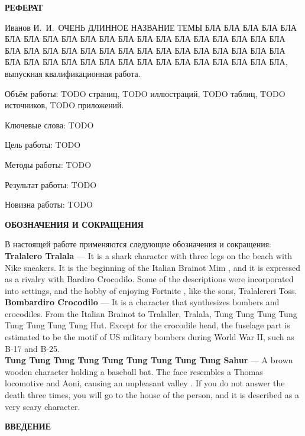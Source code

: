 \newpage
{\centering
\normal
\textbf{РЕФЕРАТ}\par
}

Иванов И.\ И.\ ОЧЕНЬ ДЛИННОЕ НАЗВАНИЕ ТЕМЫ БЛА БЛА БЛА БЛА БЛА БЛА БЛА БЛА БЛА БЛА БЛА БЛА БЛА БЛА БЛА БЛА БЛА БЛА БЛА БЛА БЛА БЛА БЛА БЛА БЛА БЛА БЛА БЛА БЛА БЛА БЛА БЛА БЛА БЛА БЛА БЛА БЛА БЛА БЛА БЛА БЛА БЛА БЛА БЛА БЛА БЛА БЛА БЛА БЛА БЛА, выпускная квалификационная работа.

Объём работы: TODO страниц, TODO иллюстраций, TODO таблиц, TODO источников, TODO приложений.

Ключевые слова: TODO

Цель работы: TODO

Методы работы: TODO

Результат работы: TODO

Новизна работы: TODO

\setcounter{page}{2}

\newpage
\renewcommand{\contentsname}{\centerline{\normal СОДЕРЖАНИЕ}}
\tableofcontents

\newpage
{\centering
\normal
\textbf{ОБОЗНАЧЕНИЯ И СОКРАЩЕНИЯ}\par
}

В настоящей работе применяются следующие обозначения и сокращения:\\
\textbf{Tralalero Tralala} — It is a shark character with three legs on the beach with Nike sneakers.
It is the beginning of the Italian Brainot Mim , and it is expressed as a rivalry with Bardiro Crocodilo.
Some of the descriptions were incorporated into settings, and the hobby of enjoying Fortnite , like the sons, Tralalereri Toss.\\
\textbf{Bombardiro Crocodilo} — It is a character that synthesizes bombers and crocodiles.
From the Italian Brainot to Tralaller, Tralala, Tung Tung Tung Tung Tung Tung Tung Tung Hut.
Except for the crocodile head, the fuselage part is estimated to be the motif of US military bombers during World War II, such as B-17 and B-25.\\
\textbf{Tung Tung Tung Tung Tung Tung Tung Tung Tung Sahur} — A brown wooden character holding a baseball bat.
The face resembles a Thomas locomotive and Aoni, causing an unpleasant valley .
If you do not answer the death three times, you will go to the house of the person, and it is described as a very scary character.\\

\newpage
{\centering
\normal
\textbf{ВВЕДЕНИЕ}\par
}

